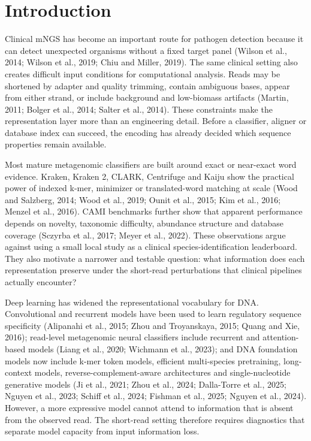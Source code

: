 \documentclass[10.5pt]{article}
\begin{document}
\section*{Introduction}

Clinical mNGS has become an important route for pathogen detection because it can detect unexpected organisms without a fixed target panel (Wilson et al., 2014; Wilson et al., 2019; Chiu and Miller, 2019). The same clinical setting also creates difficult input conditions for computational analysis. Reads may be shortened by adapter and quality trimming, contain ambiguous bases, appear from either strand, or include background and low-biomass artifacts (Martin, 2011; Bolger et al., 2014; Salter et al., 2014). These constraints make the representation layer more than an engineering detail. Before a classifier, aligner or database index can succeed, the encoding has already decided which sequence properties remain available.


Most mature metagenomic classifiers are built around exact or near-exact word evidence. Kraken, Kraken 2, CLARK, Centrifuge and Kaiju show the practical power of indexed k-mer, minimizer or translated-word matching at scale (Wood and Salzberg, 2014; Wood et al., 2019; Ounit et al., 2015; Kim et al., 2016; Menzel et al., 2016). CAMI benchmarks further show that apparent performance depends on novelty, taxonomic difficulty, abundance structure and database coverage (Sczyrba et al., 2017; Meyer et al., 2022). These observations argue against using a small local study as a clinical species-identification leaderboard. They also motivate a narrower and testable question: what information does each representation preserve under the short-read perturbations that clinical pipelines actually encounter?


Deep learning has widened the representational vocabulary for DNA. Convolutional and recurrent models have been used to learn regulatory sequence specificity (Alipanahi et al., 2015; Zhou and Troyanskaya, 2015; Quang and Xie, 2016); read-level metagenomic neural classifiers include recurrent and attention-based models (Liang et al., 2020; Wichmann et al., 2023); and DNA foundation models now include k-mer token models, efficient multi-species pretraining, long-context models, reverse-complement-aware architectures and single-nucleotide generative models (Ji et al., 2021; Zhou et al., 2024; Dalla-Torre et al., 2025; Nguyen et al., 2023; Schiff et al., 2024; Fishman et al., 2025; Nguyen et al., 2024). However, a more expressive model cannot attend to information that is absent from the observed read. The short-read setting therefore requires diagnostics that separate model capacity from input information loss.
\end{document}
